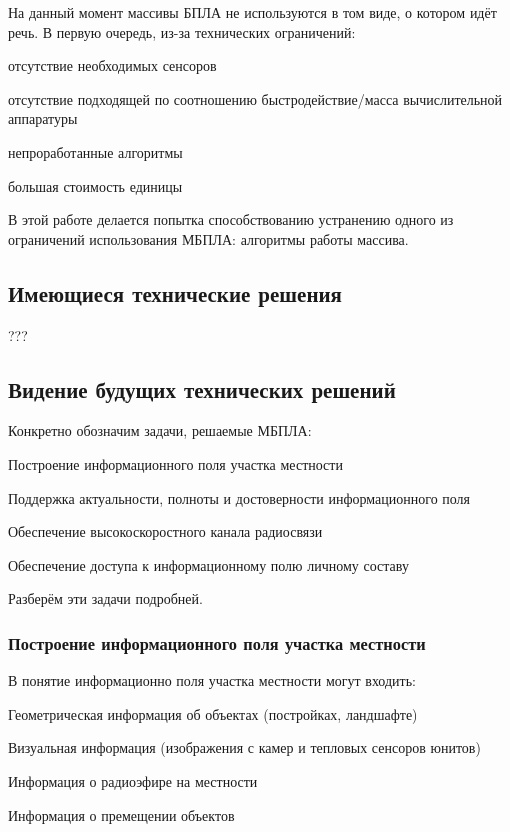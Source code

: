 На данный момент массивы БПЛА не используются в том виде,
о котором идёт речь. В первую очередь, из-за технических
ограничений:
\begin{mintemize}
    \item отсутствие необходимых сенсоров
    \item отсутствие подходящей по соотношению быстродействие/масса
        вычислительной аппаратуры
    \item непроработанные алгоритмы
    \item большая стоимость единицы
\end{mintemize}

В этой работе делается попытка способствованию
устранению одного из ограничений использования МБПЛА:
алгоритмы работы массива.

\newpage
\subsection{Имеющиеся технические решения}

???

\newpage
\subsection{Видение будущих технических решений}

Конкретно обозначим задачи, решаемые МБПЛА:

\begin{mintemize}
\item Построение информационного поля участка местности
\item Поддержка актуальности, полноты и достоверности информационного поля
\item Обеспечение высокоскоростного канала радиосвязи
\item Обеспечение доступа к информационному полю личному составу
\end{mintemize}

Разберём эти задачи подробней.

\subsubsection{Построение информационного поля участка местности}

В понятие информационно поля участка местности могут входить:

\begin{mintemize}
\item Геометрическая информация об объектах (постройках, ландшафте)
\item Визуальная информация (изображения с камер и тепловых сенсоров юнитов)
\item Информация о радиоэфире на местности
\item Информация о премещении объектов
\end{mintemize}

